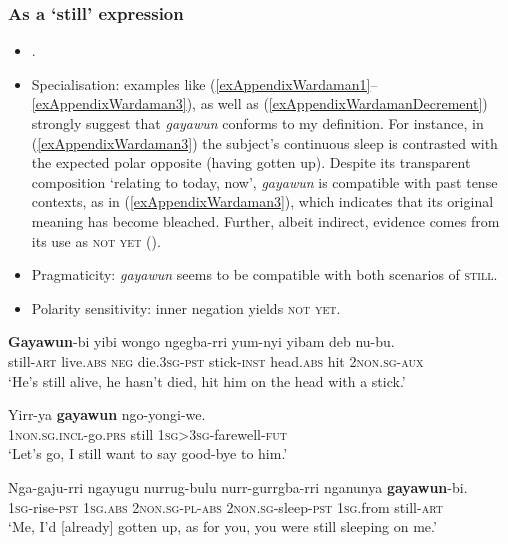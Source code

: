 \subsubsection{As a \lq{}still\rq{} expression}
\begin{itemize}
	\item \textcite[164, 323]{Merlan1994}.
	\item Specialisation: examples like (\ref{exAppendixWardaman1}–\ref{exAppendixWardaman3}), as well as (\ref{exAppendixWardamanDecrement}) strongly suggest that \textit{gayawun} conforms to my definition. For instance, in (\ref{exAppendixWardaman3}) the subject's continuous sleep is contrasted with the expected polar opposite (having gotten up). Despite its transparent composition \lq relating to today, now', \textit{gayawun} is compatible with past tense contexts, as in (\ref{exAppendixWardaman3}), which indicates that its original meaning has become bleached. Further, albeit indirect, evidence comes from its use as \textsc{not yet} ().
	\item Pragmaticity: \textit{gayawun} seems to be compatible with both scenarios of \textsc{still}.
	\item Polarity sensitivity: inner negation yields \textsc{not yet}.
\end{itemize}
\largerpage
\begin{exe}
	\ex \label{exAppendixWardaman1}
	\gll \textbf{Gayawun}-bi yibi wongo ngegba-rri yum-nyi yibam deb nu-bu.\\
	still-\textsc{art} live.\textsc{abs} \textsc{neg} die.3\textsc{sg}-\textsc{pst} stick-\textsc{inst} head.\textsc{abs} hit 2\textsc{non}.\textsc{sg}-\textsc{aux}\\
	\glt \lq He’s still alive, he hasn’t died, hit him on the head with a stick.' \parencite[164]{Merlan1994}

	\ex \label{exAppendixWardaman2}
	\gll Yirr-ya \textbf{gayawun} ngo-yongi-we.\\
	1\textsc{non}.\textsc{sg}.\textsc{incl}-go.\textsc{prs} still 1\textsc{sg}>3\textsc{sg}-farewell-\textsc{fut}\\
	\glt \lq Let's go, I still want to say good-bye to him.' \parencite[164]{Merlan1994}
	
	\ex \label{exAppendixWardaman3}
	\gll Nga-gaju-rri ngayugu nurrug-bulu nurr-gurrgba-rri nganunya \textbf{gayawun}-bi.\\
	1\textsc{sg}-rise-\textsc{pst} 1\textsc{sg}.\textsc{abs} 2\textsc{non}.\textsc{sg}-\textsc{pl}-\textsc{abs} 2\textsc{non}.\textsc{sg}-sleep-\textsc{pst} 1\textsc{sg}.from still-\textsc{art}\\
	\glt \lq Me, I’d [already] gotten up, as for you, you were still sleeping on me.' \parencite[323]{Merlan1994}
\end{exe}

